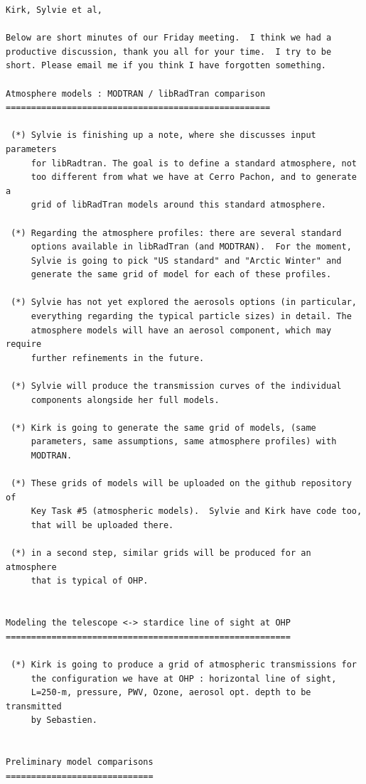 \documentclass[a4paper]{article}
\begin{document}
\begin{verbatim}
Kirk, Sylvie et al, 

Below are short minutes of our Friday meeting.  I think we had a
productive discussion, thank you all for your time.  I try to be
short. Please email me if you think I have forgotten something.

Atmosphere models : MODTRAN / libRadTran comparison
====================================================

 (*) Sylvie is finishing up a note, where she discusses input parameters
     for libRadtran. The goal is to define a standard atmosphere, not
     too different from what we have at Cerro Pachon, and to generate a
     grid of libRadTran models around this standard atmosphere. 

 (*) Regarding the atmosphere profiles: there are several standard
     options available in libRadTran (and MODTRAN).  For the moment,
     Sylvie is going to pick "US standard" and "Arctic Winter" and
     generate the same grid of model for each of these profiles.

 (*) Sylvie has not yet explored the aerosols options (in particular,
     everything regarding the typical particle sizes) in detail. The
     atmosphere models will have an aerosol component, which may require
     further refinements in the future.

 (*) Sylvie will produce the transmission curves of the individual
     components alongside her full models. 

 (*) Kirk is going to generate the same grid of models, (same
     parameters, same assumptions, same atmosphere profiles) with
     MODTRAN.

 (*) These grids of models will be uploaded on the github repository of
     Key Task #5 (atmospheric models).  Sylvie and Kirk have code too,
     that will be uploaded there.

 (*) in a second step, similar grids will be produced for an atmosphere
     that is typical of OHP.


Modeling the telescope <-> stardice line of sight at OHP
========================================================

 (*) Kirk is going to produce a grid of atmospheric transmissions for
     the configuration we have at OHP : horizontal line of sight,
     L=250-m, pressure, PWV, Ozone, aerosol opt. depth to be transmitted
     by Sebastien.


Preliminary model comparisons
=============================


\end{verbatim}
\end{document}
